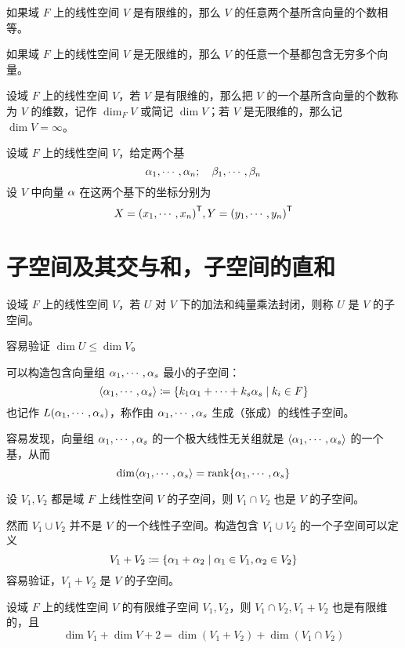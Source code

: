 如果域 $F$ 上的线性空间 $V$ 是有限维的，那么 $V$ 的任意两个基所含向量的个数相等。

如果域 $F$ 上的线性空间 $V$ 是无限维的，那么 $V$ 的任意一个基都包含无穷多个向量。

\begin{definition}
    设域 $F$ 上的线性空间 $V$，若 $V$ 是有限维的，那么把 $V$ 的一个基所含向量的个数称为 $V$ 的维数，记作 $\dim_{F} V$ 或简记 $\dim V$；若 $V$ 是无限维的，那么记 $\dim V = \infty$。
\end{definition}

设域 $F$ 上的线性空间 $V$，给定两个基
\[ \alpha_1,\cdots,\alpha_n; \quad \beta_1,\cdots,\beta_n \]
设 $V$ 中向量 $\alpha$ 在这两个基下的坐标分别为
\[ X = {(x_1,\cdots,x_n)}^\mathsf{T}, Y = {(y_1,\cdots,y_n)}^\mathsf{T} \]

\section{子空间及其交与和，子空间的直和}

设域 $F$ 上的线性空间 $V$，若 $U$ 对 $V$ 下的加法和纯量乘法封闭，则称 $U$ 是 $V$ 的子空间。

容易验证 $\dim U \leqslant \dim V$。

可以构造包含向量组 $\alpha_1,\cdots,\alpha_s$ 最小的子空间：
\[ \langle \alpha_1,\cdots,\alpha_s \rangle \coloneqq \{ k_1\alpha_1+\cdots+k_s\alpha_s \mid k_i\in F \} \]
也记作 $L(\alpha_1,\cdots,\alpha_s)$，称作由 $\alpha_1,\cdots,\alpha_s$ 生成（张成）的线性子空间。

容易发现，向量组 $\alpha_1,\cdots,\alpha_s$ 的一个极大线性无关组就是 $\langle \alpha_1,\cdots,\alpha_s \rangle$ 的一个基，从而
\[ \dim \langle \alpha_1,\cdots,\alpha_s \rangle = \operatorname{rank} \{ \alpha_1,\cdots,\alpha_s \}\]

\begin{theorem}
    设 $V_1,V_2$ 都是域 $F$ 上线性空间 $V$ 的子空间，则 $V_1 \cap V_2$ 也是 $V$ 的子空间。
\end{theorem}

然而 $V_1 \cup V_2$ 并不是 $V$ 的一个线性子空间。构造包含 $V_1 \cup V_2$ 的一个子空间可以定义
\[ V_1+V_2 \coloneqq \{ \alpha_1+\alpha_2 \mid \alpha_1\in V_1, \alpha_2\in V_2 \} \]
容易验证，$V_1+V_2$ 是 $V$ 的子空间。

\begin{theorem}
    设域 $F$ 上的线性空间 $V$ 的有限维子空间 $V_1,V_2$，则 $V_1 \cap V_2, V_1+V_2$ 也是有限维的，且
    \[ \dim V_1 + \dim V+2 = \dim(V_1+V_2) + \dim(V_1 \cap V_2) \]
\end{theorem}

